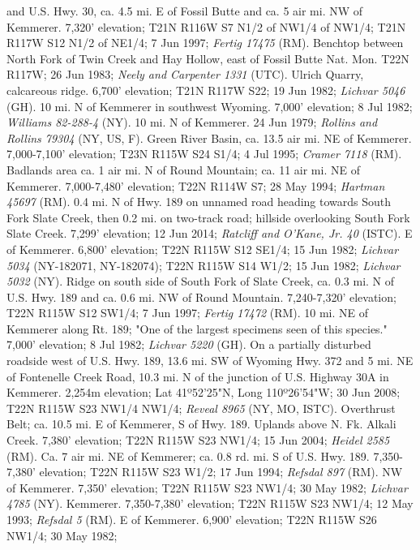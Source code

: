 and U.S. Hwy. 30, ca. 4.5 mi. E of Fossil Butte and ca. 5 air mi. NW of
Kemmerer. 7,320' elevation; T21N R116W S7 N1/2 of NW1/4 of NW1/4;
T21N R117W S12 N1/2 of NE1/4; 7 Jun 1997; \textit{Fertig 17475} (RM).
Benchtop between North Fork of Twin Creek and Hay Hollow, east of Fossil Butte
Nat. Mon. T22N R117W; 26 Jun 1983; \textit{Neely and Carpenter 1331} (UTC).
Ulrich Quarry, calcareous ridge. 6,700' elevation; T21N R117W S22; 19 Jun 1982;
\textit{Lichvar 5046} (GH).
10 mi. N of Kemmerer in southwest Wyoming. 7,000' elevation; 8 Jul 1982;
\textit{Williams 82-288-4} (NY).
10 mi. N of Kemmerer. 24 Jun 1979;
\textit{Rollins and Rollins 79304} (NY, US, F).
Green River Basin, ca. 13.5 air mi. NE of Kemmerer. 7,000-7,100' elevation;
T23N R115W S24 S1/4; 4 Jul 1995; \textit{Cramer 7118} (RM).
Badlands area ca. 1 air mi. N of Round Mountain; ca. 11 air mi. NE of Kemmerer.
7,000-7,480' elevation; T22N R114W S7; 28 May 1994; \textit{Hartman 45697} (RM).
0.4 mi. N of Hwy. 189 on unnamed road heading towards South Fork Slate Creek,
then 0.2 mi. on two-track road; hillside overlooking South Fork Slate Creek.
7,299' elevation; 12 Jun 2014; \textit{Ratcliff and O'Kane, Jr. 40} (ISTC).
E of Kemmerer. 6,800' elevation; T22N R115W S12 SE1/4; 15 Jun 1982;
\textit{Lichvar 5034} (NY-182071, NY-182074);
T22N R115W S14 W1/2; 15 Jun 1982; \textit{Lichvar 5032} (NY).
Ridge on south side of South Fork of Slate Creek, ca. 0.3 mi. N of U.S. Hwy.
189 and ca. 0.6 mi. NW of Round Mountain. 7,240-7,320' elevation;
T22N R115W S12 SW1/4; 7 Jun 1997; \textit{Fertig 17472} (RM).
10 mi. NE of Kemmerer along Rt. 189; "One of the largest specimens seen of this
species." 7,000' elevation; 8 Jul 1982; \textit{Lichvar 5220} (GH).
On a partially disturbed roadside west of U.S. Hwy. 189, 13.6 mi. SW of Wyoming
Hwy. 372 and 5 mi. NE of Fontenelle Creek Road, 10.3 mi. N of the junction of
U.S. Highway 30A in Kemmerer. 2,254m elevation;
Lat 41º52'25"N, Long 110º26'54"W; 30 Jun 2008; T22N R115W S23 NW1/4 NW1/4;
\textit{Reveal 8965} (NY, MO, ISTC).
Overthrust Belt; ca. 10.5 mi. E of Kemmerer, S of Hwy. 189.  Uplands above N.
Fk. Alkali Creek. 7,380' elevation; T22N R115W S23 NW1/4; 15 Jun 2004;
\textit{Heidel 2585} (RM).
Ca. 7 air mi. NE of Kemmerer; ca. 0.8 rd. mi. S of U.S. Hwy. 189.
7,350-7,380' elevation; T22N R115W S23 W1/2; 17 Jun 1994;
\textit{Refsdal 897} (RM).
NW of Kemmerer. 7,350' elevation; T22N R115W S23 NW1/4; 30 May 1982;
\textit{Lichvar 4785} (NY).
Kemmerer. 7,350-7,380' elevation; T22N R115W S23 NW1/4; 12 May 1993;
\textit{Refsdal 5} (RM).
E of Kemmerer. 6,900' elevation; T22N R115W S26 NW1/4; 30 May 1982;
